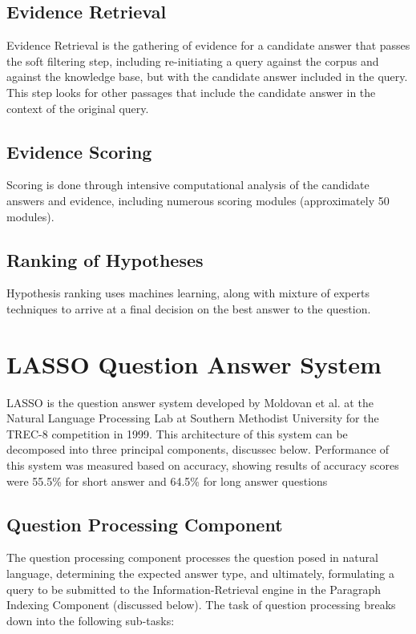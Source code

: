 \subsection{Evidence Retrieval}

Evidence Retrieval is the gathering of evidence for a candidate answer that passes the soft filtering step, including re-initiating a query against the corpus and against the knowledge base, but with the candidate answer included in the query.  This step looks for other passages that include the candidate answer in the context of the original query.

\subsection{Evidence Scoring}

Scoring is done through intensive computational analysis of the candidate answers and evidence, including numerous scoring modules (approximately 50 modules).

\subsection{Ranking of Hypotheses}

Hypothesis ranking uses machines learning, along with mixture of experts techniques to arrive at a final
decision on the best answer to the question.

\section{LASSO Question Answer System}

LASSO \cite{moldovan_1999} is the question answer system developed by Moldovan et al. at the Natural Language Processing Lab at Southern Methodist University for the TREC-8 competition in 1999.  This architecture of this system can be decomposed into three principal components, discussec below.  Performance of this system was measured based on accuracy, showing results of accuracy scores were 55.5\% for short answer and 64.5\% for long answer questions

\subsection{Question Processing Component}

The question processing component processes the question posed in natural language, determining the expected answer type, and ultimately, formulating a query to be submitted to the Information-Retrieval engine in the Paragraph Indexing Component (discussed below).  The task of question processing breaks down into the following sub-tasks:

